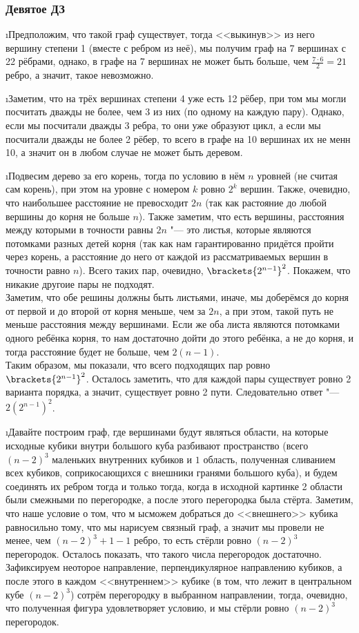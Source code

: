 \subsubsection{Девятое ДЗ}


\i Предположим, что такой граф существует, тогда <<выкинув>> из него вершину степени 1 (вместе с ребром из неё), мы получим граф на 7 вершинах с 22 рёбрами, однако, в графе на 7 вершинах не может быть больше, чем $\frac{7 \cdot 6}{2} = 21$ ребро, а значит, такое невозможно.

\i Заметим, что на трёх вершинах степени 4 уже есть 12 рёбер, при том мы могли посчитать дважды не более, чем 3 из них (по одному на каждую пару). Однако, если мы посчитали дважды 3 ребра, то они уже образуют цикл, а если мы посчитали дважды не более 2 рёбер, то всего в графе на 10 вершинах их не менн 10, а значит он в любом случае не может быть деревом.

\i Подвесим дерево за его корень, тогда по условию в нём $n$ уровней (не считая сам корень), при этом на уровне с номером $k$ ровно $2^k$ вершин. Также, очевидно, что наибольшее расстояние не превосходит $2n$ (так как растояние до любой вершины до корня не больше $n$). Также заметим, что есть вершины, расстояния между которыми в точности равны $2n$ "--- это листья, которые являются потомками разных детей корня (так как нам гарантированно придётся пройти через корень, а расстояние до него от каждой из рассматриваемых вершин в точности равно $n$). Всего таких пар, очевидно, $\brackets{2^{n-1}}^2$. Покажем, что никакие другоие пары не подходят.\\
Заметим, что обе решины должны быть листьями, иначе, мы доберёмся до корня от первой и до второй от корня меньше, чем за $2n$, а при этом, такой путь не меньше расстояния между вершинами. Если же оба листа являются потомками одного ребёнка корня, то нам достаточно дойти до этого ребёнка, а не до корня, и тогда расстояние будет не больше, чем $2(n-1)$.\\
Таким образом, мы показали, что всего подходящих пар ровно $\brackets{2^{n-1}}^2$. Осталось заметить, что для каждой пары существует ровно 2 варианта порядка, а значит, существует ровно 2 пути. Следовательно ответ "--- $2(2^{n-1})^2$.

\i Давайте построим граф, где вершинами будут являться области, на которые исходные кубики внутри большого куба разбивают пространство (всего $(n-2)^3$ маленьких внутренних кубиков и $1$ область, полученная сливанием всех кубиков, соприкосающихся с внешники гранями большого куба), и будем соединять их ребром тогда и только тогда, когда в исходной картинке 2 области были смежными по перегородке, а после этого перегородка была стёрта. Заметим, что наше условие о том, что м ысможем добраться до <<внешнего>> кубика равносильно тому, что мы нарисуем связный граф, а значит мы провели не менее, чем $(n-2)^3 + 1 - 1$ ребро, то есть стёрли ровно $(n-2)^3$ перегородок. Осталось показать, что такого числа перегородок достаточно. Зафиксируем неоторое направление, перпендикулярное направлению кубиков, а после этого в каждом <<внутреннем>> кубике (в том, что лежит в центральном кубе $(n-2)^3$) сотрём перегородку в выбранном направлении, тогда, очевидно, что полученная фигура удовлетворяет условию, и мы стёрли ровно $(n-2)^3$ перегородок.

